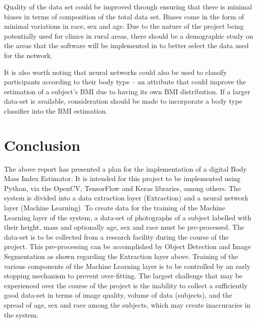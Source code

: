 \documentclass[conference]{IEEEtran}
\begin{document}
Quality of the data set could be improved through ensuring that there is minimal biases in terms of composition of the total data set.
Biases come in the form of minimal variations in race, sex and age.
Due to the nature of the project being potentially used for clinics in rural areas, there should be a demographic study on the areas that the
software will be implemented in to better select the data used for the network.

It is also worth noting that neural networks could also be used to classify participants according to their body type -- an attribute that could improve the estimation of a subject's BMI due to having its own BMI distribution. 
If a larger data-set is available, consideration should be made to incorporate a body type classifier into the BMI estimation.

\section{Conclusion}
The above report has presented a plan for the implementation of a digital Body Mass Index Estimator.
It is intended for this project to be implemented using Python, via the OpenCV, TensorFlow and Keras libraries, among others.
The system is divided into a data extraction layer (Extraction) and a neural network layer (Machine Learning).
To create data for the training of the Machine Learning layer of the system, a data-set of photographs of a subject labelled with their height, mass and optionally age, sex and race must be pre-processed.
The data-set is to be collected from a research facility during the course of the project.
This pre-processing can be accomplished by Object Detection and Image Segmentation as shown regarding the Extraction layer above.
Training of the various components of the Machine Learning layer is to be controlled by an early stopping mechanism to prevent over-fitting.
The largest challenge that may be experienced over the course of the project is the inability to collect a sufficiently good data-set in terms of image quality, volume of data (subjects), and the spread of age, sex and race among the subjects, which may create inaccuracies in the system.


\appendix
\end{document}
